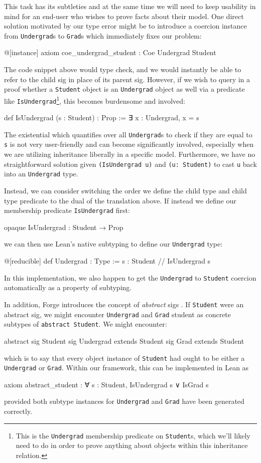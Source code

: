 This task has its subtleties and at the same time we will need to keep usability in mind for an end-user who wishes to prove facts about their model. One direct solution motivated by our type error might be to introduce a coercion instance from \texttt{Undergrad}s to \texttt{Grad}s which immediately fixes our problem:
\begin{lean*}@[instance] axiom coe_undergrad_student : Coe Undergrad Student\end{lean*}
The code snippet above would type check, and we would instantly be able to refer to the child sig in place of its parent sig. However, if we wish to query in a proof whether a \texttt{Student} object is an \texttt{Undergrad} object as well via a predicate like \texttt{IsUndergrad}\footnote{This is the \texttt{Undergrad} membership predicate on \texttt{Student}s, which we'll likely need to do in order to prove anything about objects within this inheritance relation.}, this becomes burdensome and involved:
\begin{lean*}def IsUndergrad (s : Student) : Prop := ∃ x : Undergrad, x = s\end{lean*}
The existential which quantifies over all \texttt{Undergrad}s to check if they are equal to \texttt{s} is not very user-friendly and can become significantly involved, especially when we are utilizing inheritance liberally in a specific model. Furthermore, we have no straightforward solution given \texttt{(IsUndergrad u)} and \texttt{(u: Student)} to cast \texttt{u} back into an \texttt{Undergrad} type. 

Instead, we can consider switching the order we define the child type and child type predicate to the dual of the translation above. If instead we define our membership predicate \texttt{IsUndergrad} first:
\begin{lean*}opaque IsUndergrad : Student → Prop\end{lean*}
we can then use Lean's native subtyping to define our \texttt{Undergrad} type:
\begin{lean*}
@[reducible] def Undergrad : Type :=
  { s : Student // IsUndergrad s }
\end{lean*}
In this implementation, we also happen to get the \texttt{Undergrad} to \texttt{Student} coercion automatically as a property of subtyping.

In addition, Forge introduces the concept of \emph{abstract} sigs \cite{jackson2012software}. If \texttt{Student} were an abstract sig, we might encounter \texttt{Undergrad} and \texttt{Grad} student as concrete subtypes of \texttt{abstract Student}. We might encounter:
\begin{forge*}
abstract sig Student {}
sig Undergrad extends Student {}
sig Grad extends Student {}
\end{forge*}
which is to say that every object instance of \texttt{Student} had ought to be either a \texttt{Undergrad} or \texttt{Grad}. Within our framework, this can be implemented in Lean as
\begin{lean*}
axiom abstract_student : ∀ s : Student, IsUndergrad s ∨ IsGrad s
\end{lean*}
provided both subtype instances for \texttt{Undergrad} and \texttt{Grad} have been generated correctly. 

